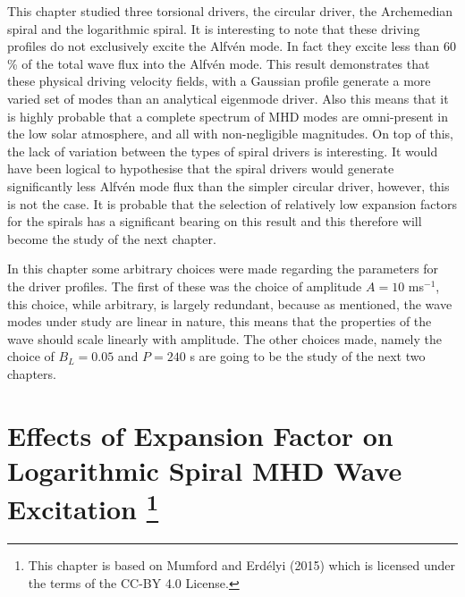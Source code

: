 \documentclass[a4paper,12pt,fourier,authoryear,custommargin]{Classes/PhDThesisPSnPDF}
\providecommand{\DIFdelbegin}{} %
\providecommand{\DIFdelend}{} %
\begin{document}
This chapter studied three torsional drivers, the circular driver, the Archemedian spiral and the logarithmic spiral.
It is interesting to note that these driving profiles do not exclusively excite the Alfv\'en mode.
In fact they excite less than $60$ \% of the total wave flux into the Alfv\'en mode.
This result demonstrates that these physical driving velocity fields, with a Gaussian profile generate a more varied set of modes than an analytical eigenmode driver.
Also this means that it is highly probable that a complete spectrum of MHD modes are omni-present in the low solar atmosphere, and all with non-negligible magnitudes.
On top of this, the lack of variation between the types of spiral drivers is interesting.
It would have been logical to hypothesise that the spiral drivers would generate significantly less Alfv\'en mode flux than the simpler circular driver, however, this is not the case.
It is probable that the selection of relatively low expansion factors for the spirals has a significant bearing on this result and this therefore will become the study of the next chapter.

In this chapter some arbitrary choices were made regarding the parameters for the driver profiles.
The first of these was the choice of amplitude $A=10$ ms$^{-1}$, this choice, while arbitrary, is largely redundant, because as mentioned, the wave modes under study are linear in nature, this means that the properties of the wave should scale linearly with amplitude.
The other choices made, namely the choice of $B_L = 0.05$ and $P=240$ s are going to be the study of the next two chapters.
\DIFdelbegin %

\DIFdelend \clearpage{}%
%

%
\clearpage{}%

\chapter[Effects of Expansion Factor on Logarithmic Spiral MHD Wave Excitation]{Effects of Expansion Factor on Logarithmic Spiral MHD Wave Excitation \footnote{This chapter is based on Mumford and Erd\'elyi (2015) which is licensed under the terms of the CC-BY 4.0 License.}}\label{ch:expfac}
\end{document}
